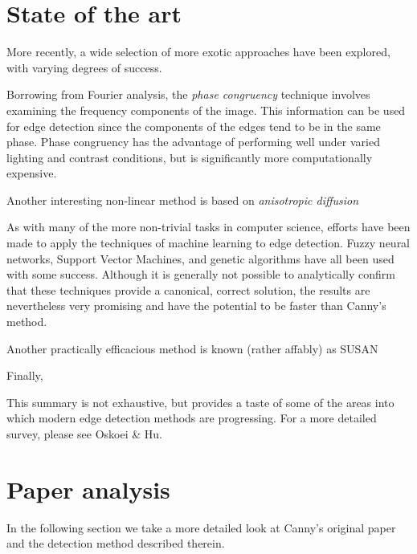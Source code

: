 \documentclass{acm_proc_article-sp}
\begin{document}
\section*{State of the art}

More recently, a wide selection of more exotic approaches have been explored,
with varying degrees of success.

Borrowing from Fourier analysis, the \emph{phase congruency}
technique\cite{Kovesi} involves examining the frequency components of the
image. This information can be used for edge detection since the components of
the edges tend to be in the same phase. Phase congruency has the advantage of
performing well under varied lighting and contrast conditions, but is
significantly more computationally expensive.

Another interesting non-linear method is based on \emph{anisotropic diffusion}


As with many of the more non-trivial tasks in computer science, efforts have
been made to apply the techniques of machine learning to edge detection. Fuzzy
neural networks\cite{Lu20032395}, Support Vector Machines\cite{Zheng20041143},
and genetic algorithms\cite{Bhandarkar19941159} have all been used with some
success. Although it is generally not possible to analytically confirm that
these techniques provide a canonical, correct solution, the results are
nevertheless very promising and have the potential to be faster than Canny's
method.

Another practically efficacious method is known (rather affably) as SUSAN


Finally, 

This summary is not exhaustive, but provides a taste of some of the areas into
which modern edge detection methods are progressing. For a more detailed
survey, please see Oskoei & Hu\cite{oskoei2010survey}.

\section*{Paper analysis}

In the following section we take a more detailed look at Canny's original paper\cite{4767851} and the detection method described therein.





{}



\balancecolumns
\end{document}
